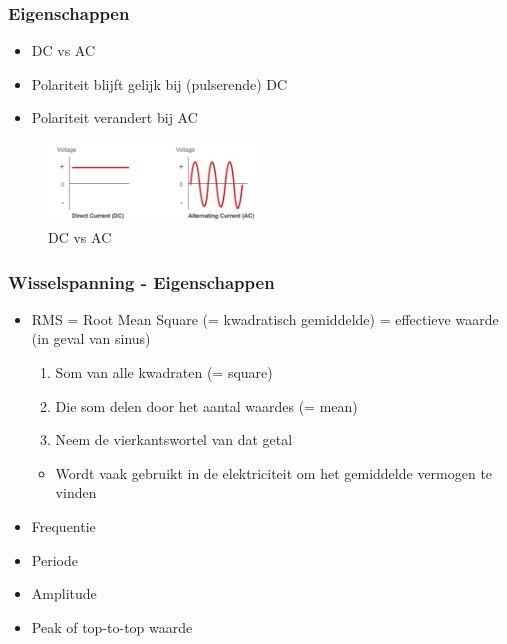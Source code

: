 \documentclass{article}
\begin{document}
\subsubsection{Eigenschappen}
\begin{itemize}
    \item DC vs AC
    \item Polariteit blijft gelijk bij (pulserende) DC
    \item Polariteit verandert bij AC
\end{itemize}



\begin{figure}[H]
    \centering
    \includegraphics[width=0.5\textwidth]{Screenshot_20200217_121011.png}
    \caption{DC vs AC}
\end{figure}

\subsubsection{Wisselspanning - Eigenschappen}
\begin{itemize}
    \item RMS = Root Mean Square (= kwadratisch gemiddelde) = effectieve waarde (in geval van sinus)
    \begin{enumerate}
        \item Som van alle kwadraten (= square)
        \item Die som delen door het aantal waardes (= mean)
        \item Neem de vierkantswortel van dat getal
    \end{enumerate}
    \begin{itemize}
        \item Wordt vaak gebruikt in de elektriciteit om het gemiddelde vermogen te vinden
    \end{itemize}
    \item Frequentie
    \item Periode
    \item Amplitude
    \item Peak of top-to-top waarde
\end{itemize}
\end{document}
